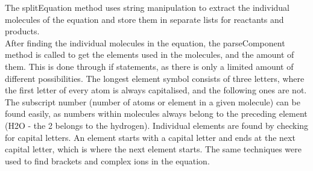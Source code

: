 \documentclass[a4paper,12pt]{article}
\begin{document}
The splitEquation method uses string manipulation to extract the individual molecules of the equation and store them in separate lists for reactants and products.\\
After finding the individual molecules in the equation, the parseComponent method is called to get the elements used in the molecules, and the amount of them. This is done through if statements, as there is only a limited amount of different possibilities. The longest element symbol consists of three letters, where the first letter of every atom is always capitalised, and the following ones are not. The subscript number (number of atoms or element in a given molecule) can be found easily, as numbers within molecules always belong to the preceding element (H2O - the 2 belongs to the hydrogen). Individual elements are found by checking for capital letters. An element starts with a capital letter and ends at the next capital letter, which is where the next element starts. The same techniques were used to find brackets and complex ions in the equation.
\end{document}
